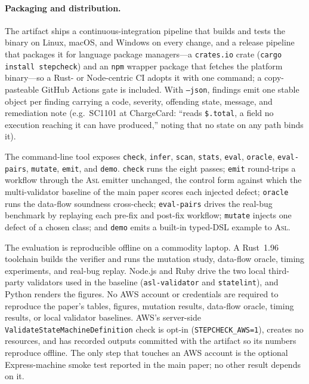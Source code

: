 \documentclass[11pt]{article}
\newcommand{\code}[1]{\textsf{\small #1}}
\newcommand{\asl}{\textsc{Asl}}
\theoremstyle{plain}
\theoremstyle{definition}
\theoremstyle{remark}
\begin{document}
\paragraph{Packaging and distribution.}
The artifact ships a continuous-integration pipeline that builds and tests the binary on Linux,
macOS, and Windows on every change, and a release pipeline that packages it for language package
managers---a \texttt{crates.io} crate (\texttt{cargo install stepcheck}) and an \texttt{npm}
wrapper package that fetches the platform binary---so a Rust- or Node-centric CI adopts it with
one command; a copy-pasteable GitHub Actions gate is included. With \texttt{--json}, findings
emit one stable object per finding carrying a code, severity, offending state, message, and
remediation note (e.g.\ \code{SC1101} at \code{ChargeCard}: ``reads \texttt{\$.total}, a field no
execution reaching it can have produced,'' noting that no state on any path binds it).

The command-line tool exposes \texttt{check}, \texttt{infer}, \texttt{scan}, \texttt{stats},
\texttt{eval}, \texttt{oracle}, \texttt{eval-pairs}, \texttt{mutate}, \texttt{emit}, and
\texttt{demo}. \texttt{check} runs the eight passes; \texttt{emit} round-trips a workflow
through the \asl{} emitter unchanged, the control form against which the multi-validator
baseline of the main paper scores each injected defect; \texttt{oracle} runs the data-flow
soundness cross-check; \texttt{eval-pairs} drives the real-bug benchmark by replaying each
pre-fix and post-fix workflow; \texttt{mutate} injects one defect of a chosen class; and
\texttt{demo} emits a built-in typed-DSL example to \asl.

The evaluation is reproducible offline on a commodity laptop. A Rust~1.96 toolchain builds the
verifier and runs the mutation study, data-flow oracle, timing experiments, and real-bug replay.
Node.js and Ruby drive the two local third-party validators used in the baseline
(\texttt{asl-validator} and \texttt{statelint}), and Python renders the figures. No AWS account or
credentials are required to reproduce the paper's tables, figures, mutation results, data-flow
oracle, timing results, or local validator baselines. AWS's server-side
\texttt{ValidateStateMachineDefinition} check is opt-in (\texttt{STEPCHECK\_AWS=1}), creates no
resources, and has recorded outputs committed with the artifact so its numbers reproduce offline.
The only step that touches an AWS account is the optional Express-machine smoke test reported in
the main paper; no other result depends on it.
\end{document}
